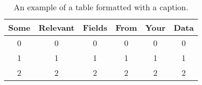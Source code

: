 \begin{table}[H]
	\centering
	\small
	\caption[A demonstration of a table typeset in \LaTeX{}.]{An example of a table formatted with a caption.}
	\begin{tabular}{c|c|c|c|c|c}
		\toprule
		Some & Relevant & Fields & From & Your & Data\\
		\midrule
		0 & 0 & 0 & 0 & 0 & 0\\
		1 & 1 & 1 & 1 & 1 & 1\\
		2 & 2 & 2 & 2 & 2 & 2\\
		\bottomrule
	\end{tabular}
	\label{tbl:example_table}
\end{table}

%
%	
